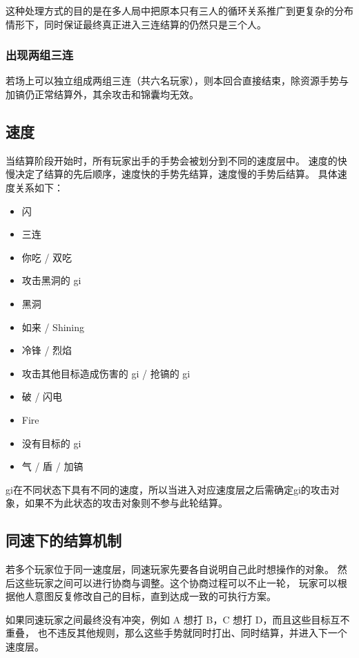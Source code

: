 \documentclass[12pt]{ctexart}
\begin{document}
这种处理方式的目的是在多人局中把原本只有三人的循环关系推广到更复杂的分布情形下，同时保证最终真正进入三连结算的仍然只是三个人。

\subsubsection{出现两组三连}

若场上可以独立组成两组三连（共六名玩家），则本回合直接结束，除资源手势与加镐仍正常结算外，其余攻击和锦囊均无效。

\subsection{速度}

当结算阶段开始时，所有玩家出手的手势会被划分到不同的速度层中。
速度的快慢决定了结算的先后顺序，速度快的手势先结算，速度慢的手势后结算。
具体速度关系如下：

\begin{itemize}
    \item 闪
    \item 三连
    \item 你吃 / 双吃
    \item 攻击黑洞的 gi
    \item 黑洞
    \item 如来 / Shining
    \item 冷锋 / 烈焰
    \item 攻击其他目标造成伤害的 gi / 抢镐的 gi
    \item 破 / 闪电
    \item Fire
    \item 没有目标的 gi
    \item 气 / 盾 / 加镐
\end{itemize}

gi在不同状态下具有不同的速度，所以当进入对应速度层之后需确定gi的攻击对象，如果不为此状态的攻击对象则不参与此轮结算。

\subsection{同速下的结算机制}

若多个玩家位于同一速度层，同速玩家先要各自说明自己此时想操作的对象。
然后这些玩家之间可以进行协商与调整。这个协商过程可以不止一轮，
玩家可以根据他人意图反复修改自己的目标，直到达成一致的可执行方案。

如果同速玩家之间最终没有冲突，例如 A 想打 B，C 想打 D，而且这些目标互不重叠，
也不违反其他规则，那么这些手势就同时打出、同时结算，并进入下一个速度层。
\end{document}
